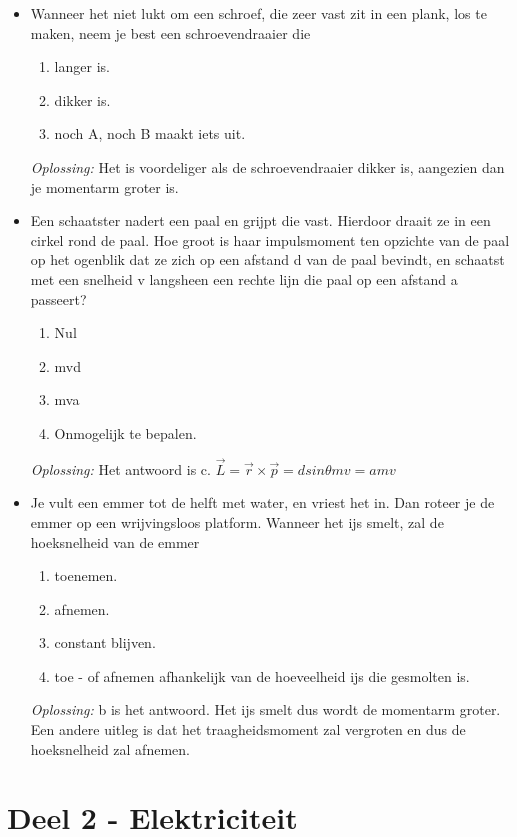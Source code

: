 \documentclass[12pt,a4paper]{article}
\begin{document}
\begin{itemize}
	\newline
	\item Wanneer het niet lukt om een schroef, die zeer vast zit in een plank, los te maken, neem je best een schroevendraaier die
	\begin{enumerate}[label=\alph*]
		\item langer is.
		\item dikker is.
		\item noch A, noch B maakt iets uit.
	\end{enumerate}
	\textit{Oplossing:} Het is voordeliger als de schroevendraaier dikker is, aangezien dan je momentarm groter is. 
	\newline
	\item Een schaatster nadert een paal en grijpt die vast. Hierdoor draait ze in een cirkel rond de paal. Hoe groot is haar impulsmoment ten opzichte van de paal op het ogenblik dat ze zich op een afstand d van de paal bevindt, en schaatst met een snelheid v langsheen een rechte lijn die paal op een afstand a passeert?
	\begin{enumerate}[label=\alph*]
		\item Nul
		\item mvd
		\item mva
		\item Onmogelijk te bepalen. 
	\end{enumerate}
	\textit{Oplossing:} Het antwoord is c. \(\vec{L} = \vec{r} \times \vec{p} = d sin\theta m v = amv\)
	\newline
	\item Je vult een emmer tot de helft met water, en vriest het in. Dan roteer je de emmer op een wrijvingsloos platform. Wanneer het ijs smelt, zal de hoeksnelheid van de emmer
	\begin{enumerate}[label=\alph*]
		\item toenemen.
		\item afnemen.
		\item constant blijven.
		\item toe - of afnemen afhankelijk van de hoeveelheid ijs die gesmolten is. 
	\end{enumerate}
	\textit{Oplossing:} b is het antwoord. Het ijs smelt dus wordt de momentarm groter. Een andere uitleg is dat het traagheidsmoment zal vergroten en dus de hoeksnelheid zal afnemen. 
	\end{itemize}
    \newpage


    \section{Deel 2 - Elektriciteit}
\end{document}
